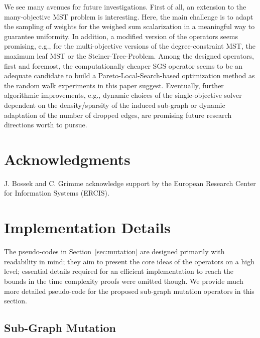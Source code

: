 \documentclass[twoside]{article}
\begin{document}
We see many avenues for future investigations. First of all, an extension to the many-objective MST problem is interesting. Here, the main challenge is to adapt the sampling of weights for the weighed sum scalarization in a meaningful way to guarantee uniformity. In addition, a modified version of the operators seems promising, e.g., for the multi-objective versions of the degree-constraint MST, the maximum leaf MST or the Steiner-Tree-Problem.
Among the designed operators, first and foremost, the computationally cheaper SGS operator seems to be an adequate candidate to build a Pareto-Local-Search-based optimization method as the random walk experiments in this paper suggest. Eventually, further algorithmic improvements, e.g., dynamic choices of the single-objective solver dependent on the density/sparsity of the induced sub-graph or dynamic adaptation of the number of dropped edges, are promising future research directions worth to pursue.

\section*{Acknowledgments}

J. Bossek and C. Grimme acknowledge support by the European Research Center for Information Systems (ERCIS).

\newpage{}
\appendix

\section{Implementation Details}
\label{sec:implementation_details}

The pseudo-codes in Section~\ref{sec:mutation} are designed primarily with readability in mind; they aim to present the core ideas of the operators on a high level; essential details required for an efficient implementation to reach the bounds in the time complexity proofs were omitted though. We provide much more detailed pseudo-code for the proposed sub-graph mutation operators in this section. 

\subsection{Sub-Graph Mutation}
\end{document}
